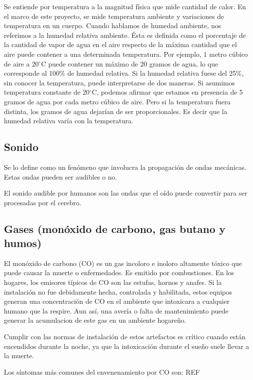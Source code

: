 \documentclass{IEEEtran}
\begin{document}
			Se entiende por temperatura a la magnitud física que mide cantidad de calor. En el marco de este proyecto, se mide temperatura ambiente y variaciones de temperatura en un cuerpo. Cuando hablamos de humedad ambiente, nos referimos a la humedad relativa ambiente. Ésta es definida como el porcentaje de la cantidad de vapor de agua en el aire respecto de la máxima cantidad que el aire puede contener a una determinada temperatura. Por ejemplo, 1 metro cúbico de aire a 20$^\circ$C puede contener un máximo de 20 gramos de agua, lo que corresponde al 100\% de humedad relativa. Si la humedad relativa fuese del 25\%, sin conocer la temperatura, puede interpretarse de dos maneras. Si asumimos temperatura constante de 20$^\circ$C, podemos afirmar que estamos en presencia de 5 gramos de agua por cada metro cúbico de aire. Pero si la temperatura fuera distinta, los gramos de agua dejarían de ser proporcionales. Es decir que la humedad relativa varía con la temperatura.

		\subsection{Sonido}

			Se lo define como un fenómeno que involucra la propagación de ondas mecánicas. Estas ondas pueden ser audibles o no.

			El sonido audible por humanos son las ondas que el oído puede convertir para ser procesadas por el cerebro.

		\subsection{Gases (monóxido de carbono, gas butano y humos)}

			El monóxido de carbono (CO) es un gas incoloro e inoloro altamente tóxico que puede causar la muerte o enfermedades. Es emitido por combustiones. En los hogares, los emisores típicos de CO son las estufas, hornos y anafes.  Si la instalación no fue debidamente hecha, controlada y habilitada, estos equipos generan una concentración de CO en el ambiente que intoxicara a cualquier humano que la respire. Aun así, una avería o falta de mantenimiento puede generar la acumulacion de este gas en un ambiente hogareño.

			Cumplir con las normas de instalación de estos artefactos es crítico cuando están encendidos durante la noche, ya que la intoxicación durante el sueño suele llevar a la muerte.

			Los síntomas más comunes del envenenamiento por CO son:  REF
\end{document}

